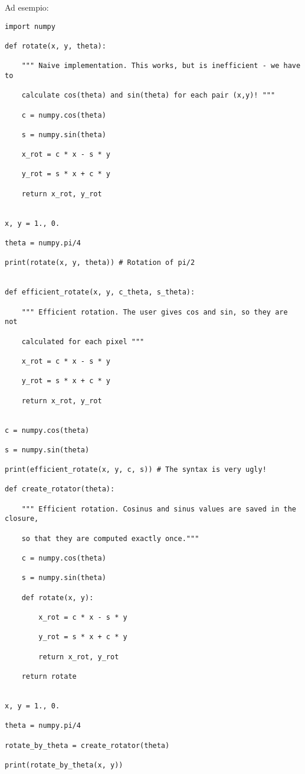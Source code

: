 \documentclass[10pt, a4paper, titlepage]{book}
\begin{document}
Ad esempio: 

\begin{verbatim}
import numpy

def rotate(x, y, theta):

	""" Naive implementation. This works, but is inefficient - we have to

	calculate cos(theta) and sin(theta) for each pair (x,y)! """

	c = numpy.cos(theta)

	s = numpy.sin(theta)

	x_rot = c * x - s * y

	y_rot = s * x + c * y

	return x_rot, y_rot


x, y = 1., 0.

theta = numpy.pi/4

print(rotate(x, y, theta)) # Rotation of pi/2


def efficient_rotate(x, y, c_theta, s_theta):

	""" Efficient rotation. The user gives cos and sin, so they are not

	calculated for each pixel """

	x_rot = c * x - s * y

	y_rot = s * x + c * y

	return x_rot, y_rot


c = numpy.cos(theta)

s = numpy.sin(theta)

print(efficient_rotate(x, y, c, s)) # The syntax is very ugly!

def create_rotator(theta):

	""" Efficient rotation. Cosinus and sinus values are saved in the closure,

	so that they are computed exactly once."""

	c = numpy.cos(theta)

	s = numpy.sin(theta)

	def rotate(x, y):

		x_rot = c * x - s * y

		y_rot = s * x + c * y

		return x_rot, y_rot

	return rotate


x, y = 1., 0.

theta = numpy.pi/4

rotate_by_theta = create_rotator(theta)

print(rotate_by_theta(x, y))
\end{verbatim}
\end{document}
